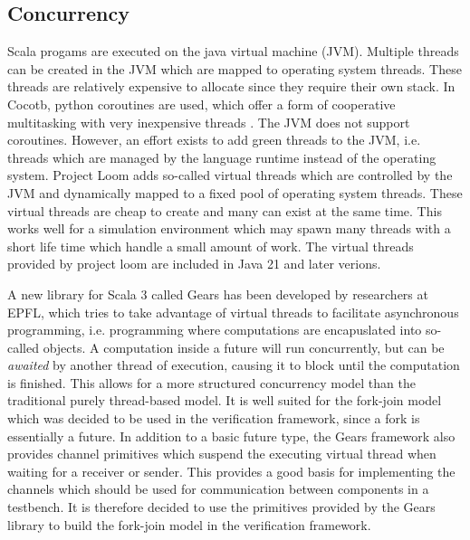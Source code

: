 
\subsection{Concurrency} %

Scala progams are executed on the java virtual machine (JVM). Multiple threads can be created in the JVM which are
mapped to operating system threads. These threads are relatively expensive to allocate since they require their own
stack. In Cocotb, python coroutines are used, which offer a form of cooperative multitasking with very inexpensive
threads \cite{pycoroutines}. The JVM does not support coroutines. However, an effort exists to add green threads to
the JVM, i.e. threads which are managed by the language runtime instead of the operating system. Project Loom
\cite{loom} adds so-called virtual threads which are controlled by the JVM and dynamically mapped to a fixed pool of
operating system threads. These virtual threads are cheap to create and many can exist at the same time. This works
well for a simulation environment which may spawn many threads with a short life time which handle a small amount of
work. The virtual threads provided by project loom are included in Java 21 and later verions.

A new library for Scala 3 called Gears \cite{gears} has been developed by researchers at EPFL, which tries to take
advantage of virtual threads to facilitate asynchronous programming, i.e. programming where computations are
encapuslated into so-called  objects. A computation inside a future will run concurrently, but can be
\textit{awaited} by another thread of execution, causing it to block until the computation is finished. This allows
for a more structured concurrency model than the traditional purely thread-based model. It is well suited for the
fork-join model which was decided to be used in the verification framework, since a fork is essentially a future. In
addition to a basic future type, the Gears framework also provides channel primitives which suspend the executing
virtual thread when waiting for a receiver or sender. This provides a good basis for implementing the channels which
should be used for communication between components in a testbench. It is therefore decided to use the primitives
provided by the Gears library to build the fork-join model in the verification framework.

